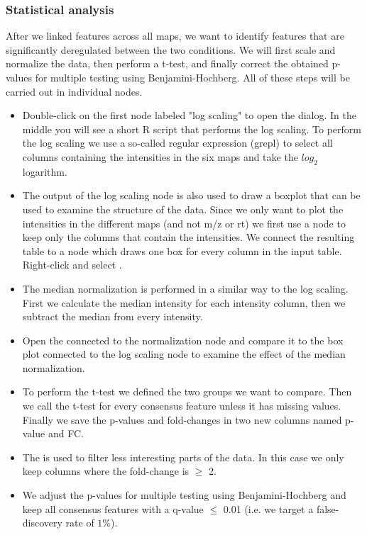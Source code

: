 \subsubsection{Statistical analysis}
After we linked features across all maps, we want to identify features that are significantly deregulated between the two conditions. We will first scale and normalize the data, then perform a t-test, and finally correct the obtained p-values for multiple testing using Benjamini-Hochberg. All of these steps will be carried out in individual  nodes.
\begin{itemize}
\item Double-click on the first  node labeled "log scaling" to open the  dialog. In the middle you will see a short R script that performs the log scaling. To perform the log scaling we use a so-called regular expression (grepl) to select all columns containing the intensities in the six maps and take the $log_2$ logarithm.

\item The output of the log scaling node is also used to draw a boxplot that can be used to examine the structure of the data. Since we only want to plot the intensities in the different maps (and not m/z or rt) we first use a  node to keep only the columns that contain the intensities. We connect the resulting table to a  node which draws one box for every column in the input table. Right-click and select .

\item The median normalization is performed in a similar way to the log scaling. First we calculate the median intensity for each intensity column, then we subtract the median from every intensity.

\item Open the  connected to the normalization node and compare it to the box plot connected to the log scaling node to examine the effect of the median normalization.

\item To perform the t-test we defined the two groups we want to compare. Then we call the t-test for every consensus feature unless it has missing values. Finally we save the p-values and fold-changes in two new columns named p-value and FC.

\item The  is used to filter less interesting parts of the data. In this case we only keep columns where the fold-change is $\geq$ 2.

\item We adjust the p-values for multiple testing using Benjamini-Hochberg and keep all consensus features with a q-value $\leq$ 0.01 (i.e. we target a false-discovery rate of $1\%$).

\end{itemize}


